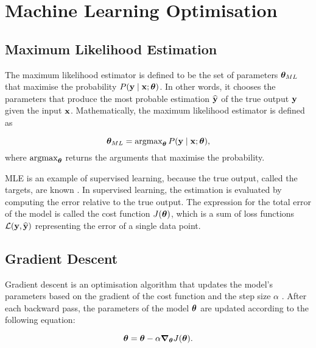 \chapter{Machine Learning Optimisation}
\label{ch:optimisation}

\section{Maximum Likelihood Estimation}


The maximum likelihood estimator is defined to be the set of parameters $\mathrm{\boldsymbol{\theta}}_{ML}$ that maximise the probability $P(\bm{\mathrm{y}} \mid \bm{\mathrm{x}}; \mathrm{\boldsymbol{\theta}})$.
In other words, it chooses the parameters that produce the most probable estimation $\bm{\mathrm{\widehat{y}}}$ of the true output $\bm{\mathrm{y}}$ given the input $\bm{\mathrm{x}}$.
Mathematically, the maximum likelihood estimator is defined as

\begin{equation}\label{eq:Max_likelihood}
    \mathrm{\boldsymbol{\theta}}_{ML} = \operatorname{argmax}_{\mathrm{\boldsymbol{\theta}}} P(\bm{\mathrm{y}} \mid \bm{\mathrm{x}}; \mathrm{\boldsymbol{\theta}}),
\end{equation}
\noindent
where $\operatorname{argmax}_{\mathrm{\boldsymbol{\theta}}}$ returns the arguments that maximise the probability.

MLE is an example of supervised learning, because the true output, called the targets, are known \cite{Goodfellow-et-al-2016}.
In supervised learning, the estimation is evaluated by computing the error relative to the true output.
The expression for the total error of the model is called the cost function $J(\mathrm{\boldsymbol{\theta}})$,
which is a sum of loss functions $\mathcal{L}(\bm{\mathrm{y}},\bm{\mathrm{\widehat{y}}} )$ representing the error of a single data point.

\section{Gradient Descent}

Gradient descent is an optimisation algorithm that updates the model's parameters based on the gradient of the cost function and the step size $\alpha$ \cite{ruder2016overview}.
After each backward pass, the parameters of the model $\mathrm{\boldsymbol{\theta}}$ are updated according to the following equation:

\begin{equation}\label{eq:GD}
    \mathrm{\boldsymbol{\theta}} = \mathrm{\boldsymbol{\theta}} - \alpha \bm{\nabla_{\theta}} J(\mathrm{\boldsymbol{\theta}}).
\end{equation}

